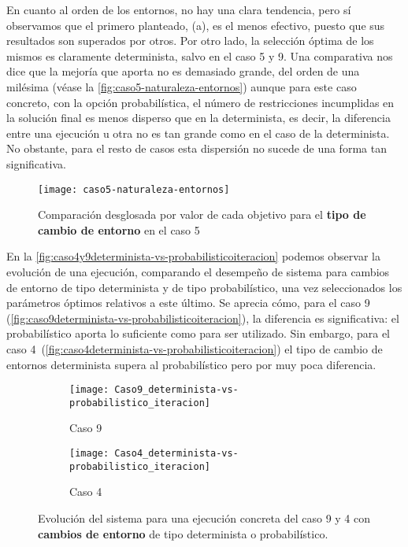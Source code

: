 En cuanto al orden de los entornos, no hay una clara tendencia, pero sí observamos que el primero planteado, (a), es el menos efectivo, puesto que sus resultados son superados por otros. Por otro lado, la selección óptima de los mismos es claramente determinista, salvo en el caso 5 y 9. 
Una comparativa nos dice que la mejoría que aporta no es demasiado grande, del orden de una milésima (véase la \autoref{fig:caso5-naturaleza-entornos}) aunque para este caso concreto, con la opción probabilística, el número de restricciones incumplidas en la solución final es menos disperso que en la determinista, es decir, la diferencia entre una ejecución u otra no es tan grande como en el caso de la determinista. No obstante, para el resto de casos esta dispersión no sucede de una forma tan significativa.

\begin{figure}
	\centering
	\texttt{[image: caso5-naturaleza-entornos]}
	\caption{Comparación desglosada por valor de cada objetivo para el \textbf{tipo de cambio de entorno} en el caso 5}
	\label{fig:caso5-naturaleza-entornos}
\end{figure}

En la \autoref{fig:caso4y9determinista-vs-probabilisticoiteracion} podemos observar la evolución de una ejecución, comparando el desempeño de sistema para cambios de entorno de tipo determinista y de tipo probabilístico, una vez seleccionados los parámetros óptimos relativos a este último. Se aprecia cómo, para el caso 9  (\autoref{fig:caso9determinista-vs-probabilisticoiteracion}), la diferencia es significativa: el probabilístico aporta lo suficiente como para ser utilizado. Sin embargo, para el caso 4~(\autoref{fig:caso4determinista-vs-probabilisticoiteracion}) el tipo de cambio de entornos determinista supera al probabilístico pero por muy poca diferencia.

\begin{figure}
	\begin{subfigure}{\linewidth}
		\centering
		\texttt{[image: Caso9\_determinista-vs-probabilistico\_iteracion]}
		\caption{Caso 9}
		\label{fig:caso9determinista-vs-probabilisticoiteracion}
	\end{subfigure}

	\begin{subfigure}{\linewidth}
		\centering
		\texttt{[image: Caso4\_determinista-vs-probabilistico\_iteracion]}
		\caption{Caso 4}
		\label{fig:caso4determinista-vs-probabilisticoiteracion}
	\end{subfigure}
	\caption{Evolución del sistema para una ejecución concreta del caso 9 y 4 con \textbf{cambios de entorno} de tipo determinista o probabilístico.}
	\label{fig:caso4y9determinista-vs-probabilisticoiteracion}
\end{figure}


